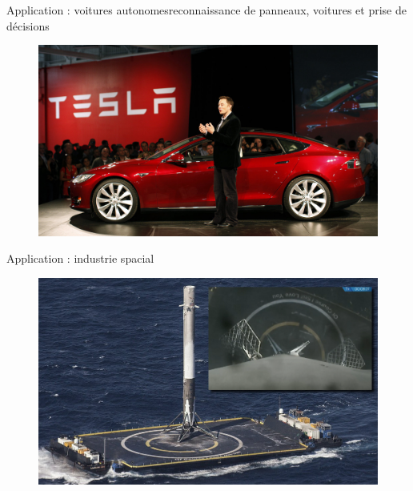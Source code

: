 \documentclass[compress]{beamer}
\begin{document}
\begin{frame}{Application : voitures autonomes}{reconnaissance de panneaux, voitures et prise de décisions}
	
	\begin{figure}
		\centering
		\includegraphics[width=1\linewidth]{resources/clem/tesla}
	\end{figure}
	
\end{frame}

\begin{frame}{Application : industrie spacial}	
	\begin{figure}
		\centering
		\includegraphics[width=1\linewidth]{resources/clem/spacex}
	\end{figure}
	
\end{frame}
\end{document}
